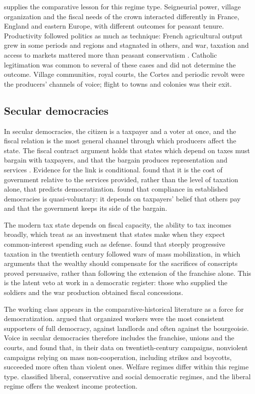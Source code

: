 \documentclass[11pt,letterpaper]{article}
\theoremstyle{definition}
\theoremstyle{remark}
\begin{document}
\citet{brenner1976} supplies the comparative lesson for this regime type. Seigneurial power, village organization and the fiscal needs of the crown interacted differently in France, England and eastern Europe, with different outcomes for peasant tenure. Productivity followed politics as much as technique: French agricultural output grew in some periods and regions and stagnated in others, and war, taxation and access to markets mattered more than peasant conservatism \citep{hoffman1996}. Catholic legitimation was common to several of these cases and did not determine the outcome. Village communities, royal courts, the Cortes and periodic revolt were the producers' channels of voice; flight to towns and colonies was their exit.

\subsection{Secular democracies}

In secular democracies, the citizen is a taxpayer and a voter at once, and the fiscal relation is the most general channel through which producers affect the state. The fiscal contract argument holds that states which depend on taxes must bargain with taxpayers, and that the bargain produces representation and services \citep{bates1985,moore2004,timmons2005}. Evidence for the link is conditional. \citet{ross2004} found that it is the cost of government relative to the services provided, rather than the level of taxation alone, that predicts democratization. \citet{levi1988} found that compliance in established democracies is quasi-voluntary: it depends on taxpayers' belief that others pay and that the government keeps its side of the bargain.

The modern tax state depends on fiscal capacity, the ability to tax incomes broadly, which \citet{besley2011,besley2013} treat as an investment that states make when they expect common-interest spending such as defense. \citet{scheve2016} found that steeply progressive taxation in the twentieth century followed wars of mass mobilization, in which arguments that the wealthy should compensate for the sacrifices of conscripts proved persuasive, rather than following the extension of the franchise alone. This is the latent veto at work in a democratic register: those who supplied the soldiers and the war production obtained fiscal concessions.

The working class appears in the comparative-historical literature as a force for democratization. \citet{rueschemeyer1992} argued that organized workers were the most consistent supporters of full democracy, against landlords and often against the bourgeoisie. Voice in secular democracies therefore includes the franchise, unions and the courts, and \citet{chenoweth2011} found that, in their data on twentieth-century campaigns, nonviolent campaigns relying on mass non-cooperation, including strikes and boycotts, succeeded more often than violent ones. Welfare regimes differ within this regime type. \citet{esping1990} classified liberal, conservative and social democratic regimes, and the liberal regime offers the weakest income protection.
\end{document}
